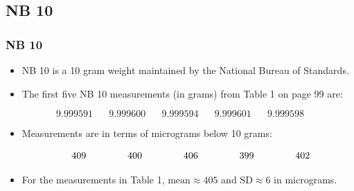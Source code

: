 \documentclass[t]{beamer}
\begin{document}
\subsection{NB 10}
\begin{frame}[t]\frametitle{NB 10}
\newcommand{\HH}{\hspace{20pt}}
\newcommand{\HP}{\hphantom{9.999}}
{\small
\begin{itemize}
\item NB 10 is a 10 gram weight maintained by the National 
  Bureau of Standards.
\item The first five NB 10 measurements (in grams) from Table 1 on page 99
  are:
\vspace{-5pt}
\end{itemize}
\[9.999591\HH 9.999600\HH 9.999594\HH 9.999601\HH 9.999598\]\vspace{-15pt}
\begin{itemize}
\item Measurements are in terms of micrograms below 10 grams:\vspace{-3pt}
\end{itemize}
\[\HP409\HH \HP400\HH \HP406\HH \HP399\HH \HP402\]\vspace{-17pt}
\begin{itemize}
\item For the measurements in Table 1, 
  $\mbox{mean}\approx 405$
 and $\mbox{SD}\approx 6$ in micrograms.
\end{itemize}
}
\end{frame}
\end{document}
